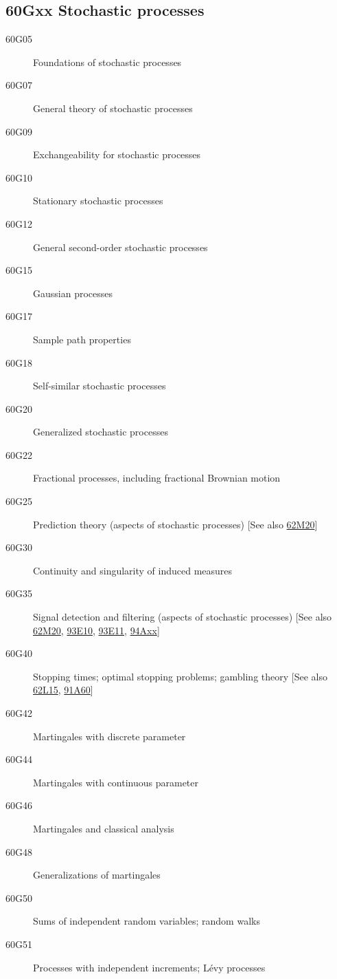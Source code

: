 \documentclass[letterpaper]{article}
\begin{document}
\subsection*{60Gxx  Stochastic processes }\label{60Gxx}
\begin{description}  
\item [60G05]\label{60G05} Foundations of stochastic processes
\item [60G07]\label{60G07} General theory of stochastic processes
\item [60G09]\label{60G09} Exchangeability for stochastic processes
\item [60G10]\label{60G10} Stationary stochastic processes
\item [60G12]\label{60G12} General second-order stochastic processes
\item [60G15]\label{60G15} Gaussian processes
\item [60G17]\label{60G17} Sample path properties
\item [60G18]\label{60G18} Self-similar stochastic processes
\item [60G20]\label{60G20} Generalized stochastic processes
\item [60G22]\label{60G22} Fractional processes, including fractional Brownian motion
\item [60G25]\label{60G25} Prediction theory (aspects of stochastic processes) [See also \hyperref[62M20]{62M20}]
\item [60G30]\label{60G30} Continuity and singularity of induced measures
\item [60G35]\label{60G35} Signal detection and filtering (aspects of stochastic processes) [See also \hyperref[62M20]{62M20}, \hyperref[93E10]{93E10}, \hyperref[93E11]{93E11}, \hyperref[94Axx]{94Axx}]
\item [60G40]\label{60G40} Stopping times; optimal stopping problems; gambling theory [See also \hyperref[62L15]{62L15}, \hyperref[91A60]{91A60}]
\item [60G42]\label{60G42} Martingales with discrete parameter
\item [60G44]\label{60G44} Martingales with continuous parameter
\item [60G46]\label{60G46} Martingales and classical analysis
\item [60G48]\label{60G48} Generalizations of martingales
\item [60G50]\label{60G50} Sums of independent random variables; random walks
\item [60G51]\label{60G51} Processes with independent increments; L\'{e}vy processes

\end{description}
\end{document}
